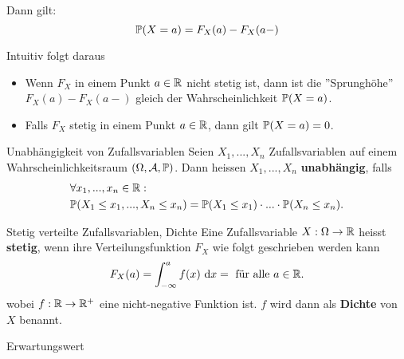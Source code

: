 Dann gilt:
$$\P(X = a) = F_X(a) - F_X(a-)$$

Intuitiv folgt daraus
\begin{itemize}
    \item Wenn $F_X$ in einem Punkt $a \in \R$ nicht stetig ist, dann ist die ''Sprunghöhe'' $F_X(a)-F_X(a-)$ gleich der Wahrscheinlichkeit $\P(X = a)$.
    \item Falls $F_X$ stetig in einem Punkt $a \in \R$, dann gilt $\P(X = a) = 0$. 
\end{itemize}

\begin{mainbox}{Unabhängigkeit von Zufallsvariablen}
    Seien $X_1, ...,X_n$ Zufallsvariablen auf einem Wahrscheinlichkeitsraum $(\Omega, \A, \P)$. Dann heissen $X_1, ...,X_n$ \textbf{unabhängig}, falls
    \begin{align*}
        &\forall x_1, ..., x_n \in \R:\\
        &\P(X_1 \leq x_1, ..., X_n \leq x_n) = \P(X_1 \leq x_1)\cdot ... \cdot \P(X_n \leq x_n).
    \end{align*} 
\end{mainbox}




\begin{mainbox}{Stetig verteilte Zufallsvariablen, Dichte}
    Eine Zufallsvariable $X: \Omega \to \R$ heisst \textbf{stetig}, wenn ihre Verteilungsfunktion $F_X$ wie folgt geschrieben werden kann
    $$F_X(a) = \int_{-\infty}^{a}f(x)\dx = \text{ für alle }a \in \R.$$
    wobei $f: \R \to \R^+$ eine nicht-negative Funktion ist. $f$ wird dann als \textbf{Dichte} von $X$ benannt.
\end{mainbox}

\begin{mainbox}{Erwartungswert}
    
\end{mainbox}